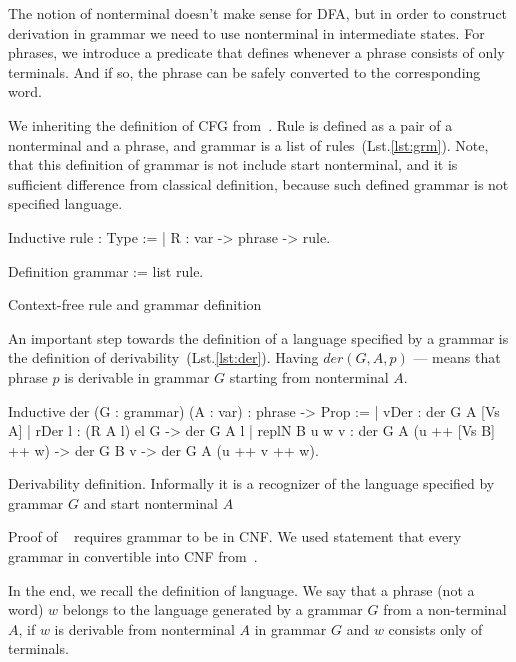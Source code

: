 The notion of nonterminal doesn't make sense for DFA, but in order to construct derivation in grammar we need to use nonterminal in intermediate states. For phrases, we introduce a predicate that defines whenever a phrase consists of only terminals. And if so, the phrase can be safely converted to the corresponding word.

We inheriting the definition of CFG from~\cite{smolkaHofmann2016}. Rule is defined as a pair of a nonterminal and a phrase, and grammar is a list of rules~(Lst.\ref{lst:grm}).
Note, that this definition of grammar is not include start nonterminal, and it is sufficient difference from classical definition, because such defined grammar is not specified language.

\begin{listing}[h]
    \begin{pyglist}[language=coq, numbers=none, numbersep=5pt]
  Inductive rule : Type :=
  | R : var -> phrase -> rule.
        
  Definition grammar := list rule.
    \end{pyglist}
    \caption{Context-free rule and grammar definition}
    \label{lst:grm}
\end{listing}

An important step towards the definition of a language specified by a grammar is the definition of derivability~(Lst.\ref{lst:der}). Having $der(G, A, p)$ --- means that phrase $p$ is derivable in grammar $G$ starting from nonterminal $A$.

\begin{listing}[h]
    \begin{pyglist}[language=coq, numbers=none, numbersep=5pt]
  Inductive der (G : grammar) 
                (A : var) : phrase -> Prop :=
  | vDer : der G A [Vs A]
  | rDer l : (R A l) el G -> der G A l
  | replN B u w v : 
      der G A (u ++ [Vs B] ++ w) -> 
      der G B v -> der G A (u ++ v ++ w).
    \end{pyglist}
    \caption{Derivability definition. Informally it is a recognizer of the language specified by grammar $G$ and start nonterminal $A$}
    \label{lst:der}
\end{listing}

Proof of ~\cite{beigelproof}  requires grammar to be in CNF. We used statement that every grammar in convertible into CNF from~\cite{smolkaHofmann2016}.

In the end, we recall the definition of language. We say that a phrase (not a word) $ w $ belongs to the language generated by a grammar $G$ from a non-terminal $A$, if $ w $ is derivable from nonterminal $ A $ in grammar $ G $ and $ w $ consists only of terminals.

